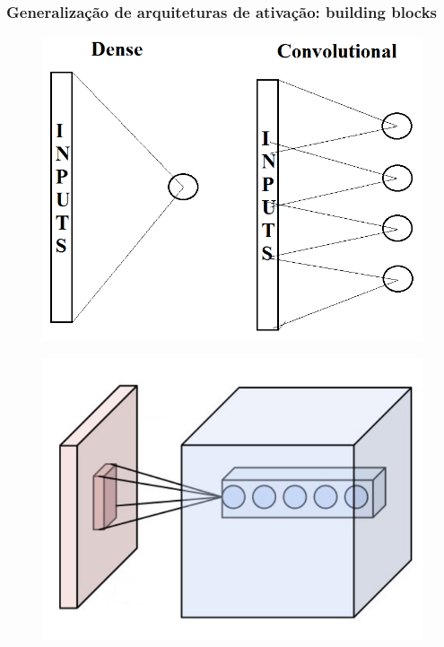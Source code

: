 \documentclass[tikz,10pt]{beamer}
\begin{document}
\begin{frame}
	\frametitle{Generalização de arquiteturas de ativação: building blocks}
	
	
	\begin{figure}
		\centering
		\includegraphics[scale=0.28]{images/denseconv.png}
	\end{figure}
	\begin{figure}
		\centering
		\includegraphics[scale=0.28]{images/conv.png}
	\end{figure}
	
\end{frame}
\end{document}
